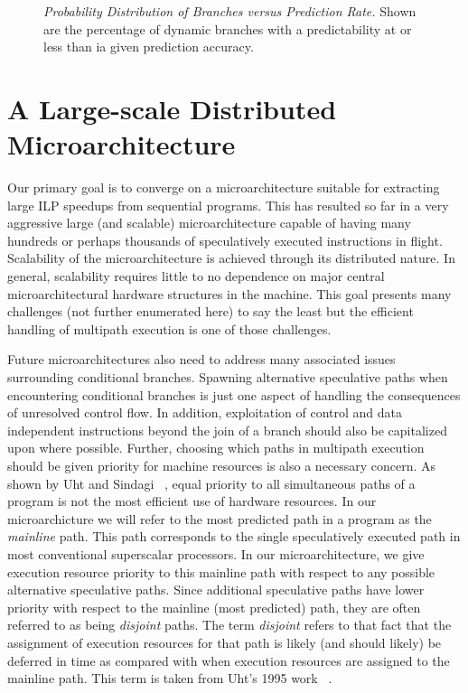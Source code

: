 \documentclass[10pt,dvips]{article}
\begin{document}
\begin{figure}
\vspace{0.2 in}
\setlength{\epsfxsize}{10cm}%
\centerline{}
\caption{{\em Probability Distribution of Branches versus Prediction Rate.} 
Shown are the percentage of dynamic
branches with a predictability at or less than ia given prediction
accuracy.}
\label{fig:bpdist}
\end{figure}
%
\section{A Large-scale Distributed Microarchitecture}
%
Our primary goal is to converge on a microarchitecture suitable
for extracting large ILP speedups from sequential programs.
This has resulted so far in a very aggressive large (and scalable)
microarchitecture capable of having many hundreds or perhaps thousands
of speculatively executed instructions in flight.  Scalability
of the microarchitecture is achieved through its distributed nature.
In general, scalability requires little to no dependence on major
central microarchitectural hardware structures in the machine.
This goal presents many challenges (not further enumerated here)
to say the least but the efficient handling of multipath execution
is one of those challenges.  

Future microarchitectures also need to 
address many associated issues surrounding conditional branches.
Spawning alternative speculative paths when encountering conditional
branches is just one aspect of handling the consequences of
unresolved control flow.
In addition, exploitation
of control
and data independent instructions beyond the join of a branch should
also be capitalized upon where possible.
Further, choosing which paths in multipath execution should
be given priority for machine resources is also a necessary concern.
As shown by Uht and Sindagi ~\cite{Uht95},
equal priority to all simultaneous paths
of a program is not the most efficient use of hardware resources.
In our microarchicture we will refer to the most predicted path
in a program as the 
\textit{mainline} path.  
This path corresponds to the single speculatively
executed path in most conventional superscalar processors.
In our microarchitecture,
we give execution resource priority to this mainline path with respect
to any possible alternative speculative paths.  
Since additional speculative paths have lower priority with
respect to the mainline (most predicted) path, they are often referred
to as being
\textit{disjoint} paths.  
The term \textit{disjoint} refers to that fact that the assignment
of execution resources for that path is likely (and should likely) be
deferred in time
as compared with when execution resources are assigned to the mainline
path.
This term is taken from Uht's 
1995 work ~\cite{Uht95}.
\end{document}
